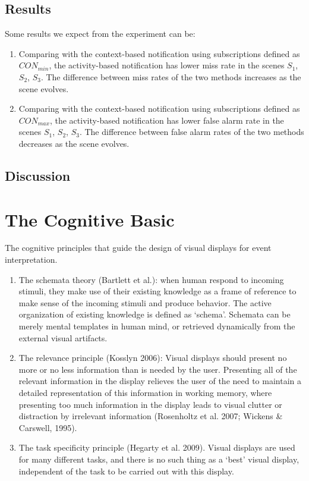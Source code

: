
\subsection{Results} %
\label{sub:results}
Some results we expect from the experiment can be:

\begin{enumerate}
	\item Comparing with the context-based notification using subscriptions defined as $CON_{min}$, the activity-based notification has lower miss rate in the scenes $S_1$, $S_2$, $S_3$. The difference between miss rates of the two methods increases as the scene evolves.
	\item Comparing with the context-based notification using subscriptions defined as $CON_{max}$, the activity-based notification has lower false alarm rate in the scenes $S_1$, $S_2$, $S_3$. The difference between false alarm rates of the two methods decreases as the scene evolves.
\end{enumerate}


\subsection{Discussion} %
\label{sub:discussion}



\section{The Cognitive Basic} %
\label{sec:the_cognitive_basic}
The cognitive principles that guide the design of visual displays for event interpretation.

\begin{enumerate}
	\item The schemata theory (Bartlett et al.): when human respond to incoming stimuli, they make use of their existing knowledge as a frame of reference to make sense of the incoming stimuli and produce behavior. The active organization of existing knowledge is defined as `schema'. Schemata can be merely mental templates in human mind, or retrieved dynamically from the external visual artifacts. 
	\item The relevance principle (Kosslyn 2006): Visual displays should present no more or no less information than is needed by the user. Presenting all of the relevant information in the display relieves the user of the need to maintain a detailed representation of this information in working memory, where presenting too much information in the display leads to visual clutter or distraction by irrelevant information (Rosenholtz et al. 2007; Wickens \& Carswell, 1995).
	\item The task specificity principle (Hegarty et al. 2009). Visual displays are used for many different tasks, and there is no such thing as a `best' visual display, independent of the task to be carried out with this display. 
\end{enumerate}

